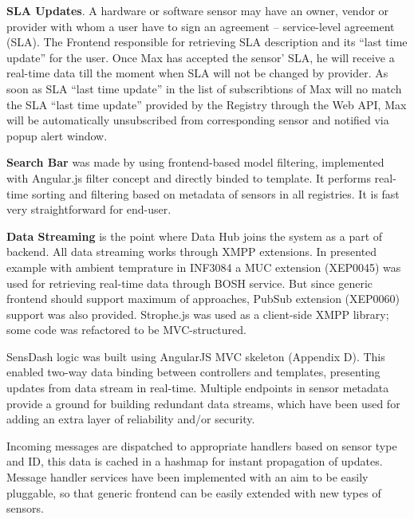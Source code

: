 \textbf{SLA Updates}. A hardware or software sensor may have an owner, vendor or provider with whom a user have to sign an agreement -- service-level agreement (SLA). The Frontend responsible for retrieving SLA description and its ``last time update'' for the user. Once Max has accepted the sensor' SLA, he will receive a real-time data till the moment when SLA will not be changed by provider. As soon as SLA ``last time update'' in the list of subscribtions of Max will no match the SLA ``last time update'' provided by the Registry through the Web API, Max will be automatically unsubscribed from corresponding sensor and notified via popup alert window.

\textbf{Search Bar} was made by using frontend-based model filtering, implemented with Angular.js filter concept and directly binded to template. It performs real-time sorting and filtering based on metadata of sensors in all registries. It is fast very straightforward for end-user. 

\textbf{Data Streaming} is the point where Data Hub joins the system as a part of backend. All data streaming works through XMPP extensions. In presented example with ambient temprature in INF3084 a MUC extension (XEP0045) was used for retrieving real-time data through BOSH service. But since generic frontend should support maximum of approaches, PubSub extension (XEP0060) support was also provided. Strophe.js was used as a client-side XMPP library; some code was refactored to be MVC-structured.

SensDash logic was built using AngularJS MVC skeleton (Appendix D). This enabled two-way data binding between controllers and templates, presenting updates from data stream in real-time. Multiple endpoints in sensor metadata provide a ground for building redundant data streams, which have been used for adding an extra layer of reliability and/or security. 

Incoming messages are dispatched to appropriate handlers based on sensor type and ID, this data is cached in a hashmap for instant propagation of updates. Message handler services have been implemented with an aim to be easily pluggable, so that generic frontend can be easily extended with new types of sensors.

